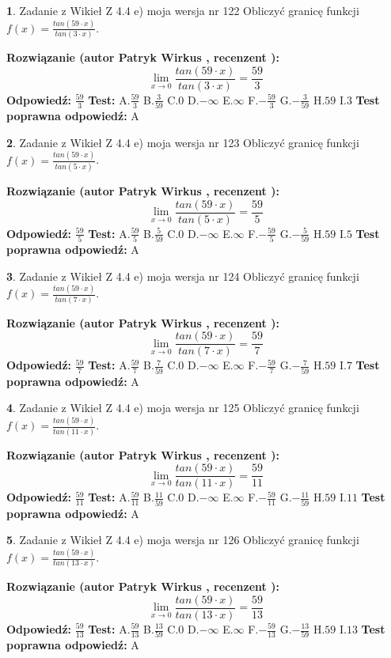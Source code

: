\documentclass[12pt, a4paper]{article}
\theoremstyle{definition} %
\newtheorem{zad}{}
\newcommand{\zadStart}[1]{\begin{zad}#1\newline}
\newcommand{\zadStop}{\end{zad}}
\newcommand{\rozwStart}[2]{\noindent \textbf{Rozwiązanie (autor #1 , recenzent #2): }\newline}
\newcommand{\rozwStop}{\newline}
\newcommand{\odpStart}{\noindent \textbf{Odpowiedź:}\newline}
\newcommand{\odpStop}{\newline}
\newcommand{\testStart}{\noindent \textbf{Test:}\newline}
\newcommand{\testStop}{\newline}
\newcommand{\kluczStart}{\noindent \textbf{Test poprawna odpowiedź:}\newline}
\newcommand{\kluczStop}{\newline}
\begin{document}
\zadStart{Zadanie z Wikieł Z 4.4 e) moja wersja nr 122}
Obliczyć granicę funkcji $f(x)=\frac{tan(59\cdot x)}{tan(3\cdot x)}$.
\zadStop
\rozwStart{Patryk Wirkus}{}
$$\lim\limits_{x\to 0}\frac{tan(59\cdot x)}{tan(3\cdot x)}=
\frac{59}{3}$$
\rozwStop
\odpStart
$\frac{59}{3}$
\odpStop
\testStart
A.$\frac{59}{3}$
B.$\frac{3}{59}$
C.$0$
D.$-\infty$
E.$\infty$
F.$-\frac{59}{3}$
G.$-\frac{3}{59}$
H.$59$
I.$3$
\testStop
\kluczStart
A
\kluczStop



\zadStart{Zadanie z Wikieł Z 4.4 e) moja wersja nr 123}
Obliczyć granicę funkcji $f(x)=\frac{tan(59\cdot x)}{tan(5\cdot x)}$.
\zadStop
\rozwStart{Patryk Wirkus}{}
$$\lim\limits_{x\to 0}\frac{tan(59\cdot x)}{tan(5\cdot x)}=
\frac{59}{5}$$
\rozwStop
\odpStart
$\frac{59}{5}$
\odpStop
\testStart
A.$\frac{59}{5}$
B.$\frac{5}{59}$
C.$0$
D.$-\infty$
E.$\infty$
F.$-\frac{59}{5}$
G.$-\frac{5}{59}$
H.$59$
I.$5$
\testStop
\kluczStart
A
\kluczStop



\zadStart{Zadanie z Wikieł Z 4.4 e) moja wersja nr 124}
Obliczyć granicę funkcji $f(x)=\frac{tan(59\cdot x)}{tan(7\cdot x)}$.
\zadStop
\rozwStart{Patryk Wirkus}{}
$$\lim\limits_{x\to 0}\frac{tan(59\cdot x)}{tan(7\cdot x)}=
\frac{59}{7}$$
\rozwStop
\odpStart
$\frac{59}{7}$
\odpStop
\testStart
A.$\frac{59}{7}$
B.$\frac{7}{59}$
C.$0$
D.$-\infty$
E.$\infty$
F.$-\frac{59}{7}$
G.$-\frac{7}{59}$
H.$59$
I.$7$
\testStop
\kluczStart
A
\kluczStop



\zadStart{Zadanie z Wikieł Z 4.4 e) moja wersja nr 125}
Obliczyć granicę funkcji $f(x)=\frac{tan(59\cdot x)}{tan(11\cdot x)}$.
\zadStop
\rozwStart{Patryk Wirkus}{}
$$\lim\limits_{x\to 0}\frac{tan(59\cdot x)}{tan(11\cdot x)}=
\frac{59}{11}$$
\rozwStop
\odpStart
$\frac{59}{11}$
\odpStop
\testStart
A.$\frac{59}{11}$
B.$\frac{11}{59}$
C.$0$
D.$-\infty$
E.$\infty$
F.$-\frac{59}{11}$
G.$-\frac{11}{59}$
H.$59$
I.$11$
\testStop
\kluczStart
A
\kluczStop



\zadStart{Zadanie z Wikieł Z 4.4 e) moja wersja nr 126}
Obliczyć granicę funkcji $f(x)=\frac{tan(59\cdot x)}{tan(13\cdot x)}$.
\zadStop
\rozwStart{Patryk Wirkus}{}
$$\lim\limits_{x\to 0}\frac{tan(59\cdot x)}{tan(13\cdot x)}=
\frac{59}{13}$$
\rozwStop
\odpStart
$\frac{59}{13}$
\odpStop
\testStart
A.$\frac{59}{13}$
B.$\frac{13}{59}$
C.$0$
D.$-\infty$
E.$\infty$
F.$-\frac{59}{13}$
G.$-\frac{13}{59}$
H.$59$
I.$13$
\testStop
\kluczStart
A
\kluczStop
\end{document}
